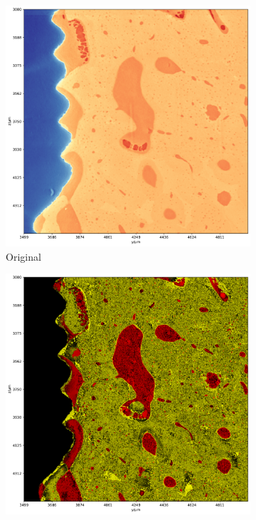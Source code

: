 \begin{figure}
  \centering
    \begin{subfigure}{0.5\textwidth}
      \centering
      \includegraphics[width=\linewidth]{generated/770c_pag_segmented_zy_raw.pdf}
      \caption{Original}
    \end{subfigure}%
    \begin{subfigure}{0.5\textwidth}
      \centering
      \includegraphics[width=\linewidth]{generated/770c_pag_global_zy_otsu.pdf}

\end{subfigure}
\end{figure}
